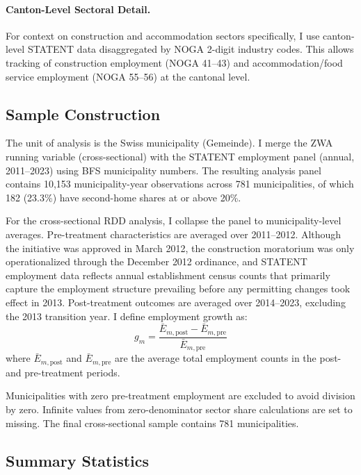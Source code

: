 \documentclass[12pt]{article}
\begin{document}
\paragraph{Canton-Level Sectoral Detail.} For context on construction and accommodation sectors specifically, I use canton-level STATENT data disaggregated by NOGA 2-digit industry codes. This allows tracking of construction employment (NOGA 41--43) and accommodation/food service employment (NOGA 55--56) at the cantonal level.

\subsection{Sample Construction}

The unit of analysis is the Swiss municipality (Gemeinde). I merge the ZWA running variable (cross-sectional) with the STATENT employment panel (annual, 2011--2023) using BFS municipality numbers. The resulting analysis panel contains 10,153 municipality-year observations across 781 municipalities, of which 182 (23.3\%) have second-home shares at or above 20\%.

For the cross-sectional RDD analysis, I collapse the panel to municipality-level averages. Pre-treatment characteristics are averaged over 2011--2012. Although the initiative was approved in March 2012, the construction moratorium was only operationalized through the December 2012 ordinance, and STATENT employment data reflects annual establishment census counts that primarily capture the employment structure prevailing before any permitting changes took effect in 2013. Post-treatment outcomes are averaged over 2014--2023, excluding the 2013 transition year. I define employment growth as:
\begin{equation}
g_m = \frac{\bar{E}_{m,\text{post}} - \bar{E}_{m,\text{pre}}}{\bar{E}_{m,\text{pre}}}
\end{equation}
where $\bar{E}_{m,\text{post}}$ and $\bar{E}_{m,\text{pre}}$ are the average total employment counts in the post- and pre-treatment periods.

Municipalities with zero pre-treatment employment are excluded to avoid division by zero. Infinite values from zero-denominator sector share calculations are set to missing. The final cross-sectional sample contains 781 municipalities.

\subsection{Summary Statistics}
\end{document}
